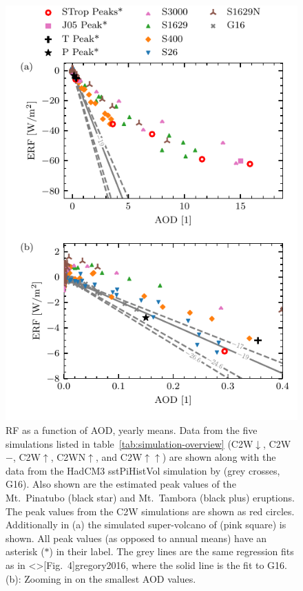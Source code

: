 \documentclass[draft]{agujournal2019}
\begin{document}
  \begin{figure}
    \centering \includegraphics{figure2}

    \caption{RF as a function of AOD, yearly means. Data from the five simulations
      listed in table~\ref{tab:simulation-overview} (C2W\(\downarrow\), C2W\(-\),
      C2W\(\uparrow\), C2WN\(\uparrow\), and C2W\(\uparrow\uparrow\)) are shown along
      with the data from the HadCM3 sstPiHistVol simulation by  (grey
      crosses, G16). Also shown are the estimated peak values of the Mt.\ Pinatubo
      (black star) and Mt.\ Tambora (black plus) eruptions. The peak values from the C2W
      simulations are shown as red circles. Additionally in (a) the simulated
      super-volcano of  (pink square) is shown. All peak values (as
      opposed to annual means) have an asterisk (\(\ast{}\)) in their label. The grey
      lines are the same regression fits as in \citeA<>[Fig.\
        4]{gregory2016}, where the solid line is the fit to G16. (b): Zooming in on the
      smallest AOD values.}\label{fig:2_rf_vs_aod_slopes}%
  \end{figure}
\end{document}
